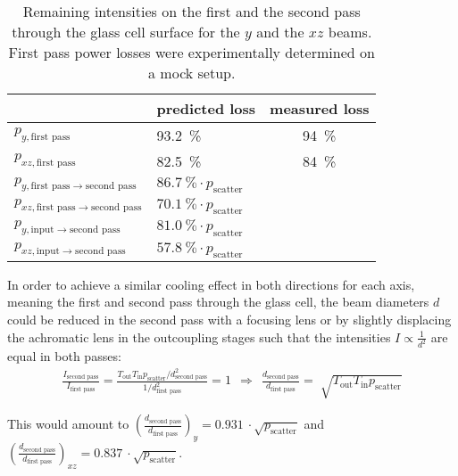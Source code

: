 \begin{table}
    \centering
    \begin{tabular}{llc}
        \toprule
        & \textbf{predicted loss} & \textbf{measured loss} \\
        \toprule
        $p_{y, \text{first pass}}$ & \SI{93.2}{\percent} & \SI{94}{\percent} \\
        $p_{xz, \text{first pass}}$ & \SI{82.5}{\percent} & \SI{84}{\percent} \\
        \midrule
        $p_{y, \text{first pass} \rightarrow \text{second pass}}$ & $\SI{86.7}{\percent} \cdot p_\text{scatter}$ & \\
        $p_{xz, \text{first pass} \rightarrow \text{second pass}}$ & $\SI{70.1}{\percent} \cdot p_\text{scatter}$ & \\
        \midrule
        $p_{y, \text{input} \rightarrow \text{second pass}}$ & $\SI{81.0}{\percent} \cdot p_\text{scatter}$ & \\
        $p_{xz, \text{input} \rightarrow \text{second pass}}$ & $\SI{57.8}{\percent} \cdot p_\text{scatter}$ & \\
        \bottomrule
    \end{tabular}
    \caption{Remaining intensities on the first and the second pass through the glass cell surface for the $y$ and the $xz$ beams. First pass power losses were experimentally determined on a mock setup.}
    \label{tab:intensity_losses}
\end{table}

In order to achieve a similar cooling effect in both directions for each axis, meaning the first and second pass through the glass cell, the beam diameters $d$ could be reduced in the second pass with a focusing lens or by slightly displacing the achromatic lens in the outcoupling stages such that the intensities $I \propto \frac{1}{d^2}$ are equal in both passes:
\begin{align}\label{eq:intensity_focusing}
\frac{I_\text{second pass}}{I_\text{first pass}} =  \frac{T_\text{out} T_\text{in} p_\text{scatter} / d^2_\text{second pass}}{1/ d^2_\text{first pass}} = 1 ~~\Rightarrow~~ \frac{d_\text{second pass}}{d_\text{first pass}} = \sqrt[]{T_\text{out} T_\text{in} p_\text{scatter}}
\end{align}

This would amount to $\left(\frac{d_\text{second pass}}{d_\text{first pass}}\right)_y = \SI[]{0.931}{} \cdot \sqrt{p_\text{scatter}}$ and $\left(\frac{d_\text{second pass}}{d_\text{first pass}}\right)_{xz} = \SI[]{0.837}{} \cdot \sqrt{p_\text{scatter}}$.

